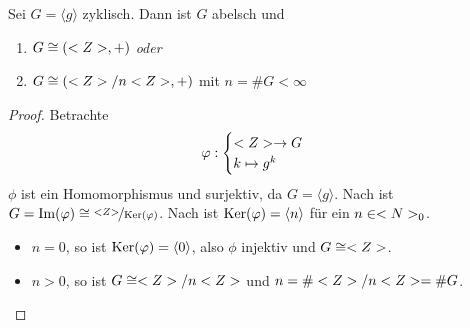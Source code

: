\begin{proposition}
	Sei $G=\langle g\rangle$ zyklisch. Dann ist $G$ abelsch und
	\begin{enumerate}[label=(\alph*)]
		\item $G\cong (<Z>,+)$ \emph{oder}
		\item $G\cong (<Z>/n<Z>,+)$ mit $n=\#G<\infty$
	\end{enumerate}
\end{proposition}
\begin{proof}
	Betrachte 
	\begin{align}
		\varphi: \begin{cases}
		<Z>\to G\\ k\mapsto g^k
		\end{cases}\notag
	\end{align}
	$\phi$ ist ein Homomorphismus und surjektiv, da $G=\langle g\rangle$. Nach  ist $G=\operatorname{Im}(\varphi)\cong \nicefrac{<Z>}{\operatorname{Ker}(\varphi)}$. Nach  ist $\operatorname{Ker}(\varphi)=\langle n\rangle$ für ein $n\in<N>_0$.
	\begin{itemize}
		\item \emph{$n=0$}, so ist $\operatorname{Ker}(\varphi)=\langle 0\rangle$, also $\phi$ injektiv und $G\cong<Z>$.
		\item \emph{$n>0$}, so ist $G\cong<Z>/n<Z>$ und $n=\#<Z>/n<Z>=\#G$.
	\end{itemize}
\end{proof}

